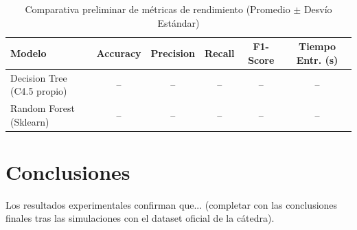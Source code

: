 \documentclass[runningheads]{llncs}
\begin{document}
\begin{table}[h]
\centering
\caption{Comparativa preliminar de métricas de rendimiento (Promedio $\pm$ Desvío Estándar)}
\label{tab:resultados}
\begin{tabular}{lccccc}
\toprule
\textbf{Modelo} & \textbf{Accuracy} & \textbf{Precision} & \textbf{Recall} & \textbf{F1-Score} & \textbf{Tiempo Entr. (s)} \\
\midrule
Decision Tree (C4.5 propio) & -- & -- & -- & -- & -- \\
Random Forest (Sklearn) & -- & -- & -- & -- & -- \\
\bottomrule
\end{tabular}
\end{table}

\section{Conclusiones}
Los resultados experimentales confirman que... (completar con las conclusiones finales tras las simulaciones con el dataset oficial de la cátedra).



\end{document}
